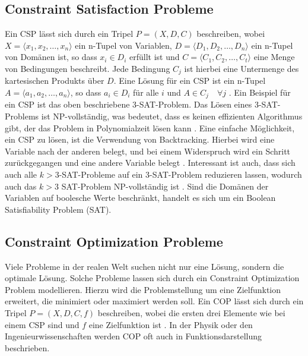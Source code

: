 \subsection{Constraint Satisfaction Probleme}
\label{sec:Constraint-Satisfaction-Probleme}

Ein CSP lässt sich durch ein Tripel \(P=(X,D,C)\) beschreiben, wobei \(X=\langle
x_{1},x_{2},\ldots,x_{n}\rangle\) ein n-Tupel von Variablen, \(D=\langle
D_{1},D_{2},\ldots,D_{n}\rangle\) ein n-Tupel von Domänen ist, so dass \(x_i\in
D_{i}\) erfüllt ist und \(C=\langle C_1,C_2,\ldots,C_t\rangle\) eine Menge von
Bedingungen beschreibt. Jede Bedingung \(C_j\) ist hierbei eine Untermenge des
kartesischen Produkts über \(D\). Eine Lösung für ein CSP ist ein n-Tupel
\(A=\langle a_1,a_2,\ldots,a_n\rangle \), so dass \(a_i\in D_i\) für alle \(i\)
und \(A \in C_j \quad \forall j\) \cite[16]{rossi06bo}. Ein Beispiel für ein CSP
ist das oben beschriebene 3-SAT-Problem. Das Lösen eines 3-SAT-Problems ist
NP-vollständig, was bedeutet, dass es keinen effizienten Algorithmus gibt, der
das Problem in Polynomialzeit lösen kann \cite[17]{rossi06bo}. Eine einfache
Möglichkeit, ein CSP zu lösen, ist die Verwendung von Backtracking. Hierbei wird
eine Variable nach der anderen belegt, und bei einem Widerspruch wird ein
Schritt zurückgegangen und eine andere Variable belegt \cite[21]{rossi06bo}.
Interessant ist auch, dass sich auch alle \(k>3\)-SAT-Probleme auf ein
3-SAT-Problem reduzieren lassen, wodurch auch das \(k>3\) SAT-Problem
NP-vollständig ist \cite[206]{gritz13bo}. Sind die Domänen der Variablen auf
boolesche Werte beschränkt, handelt es sich um ein Boolean Satisfiability
Problem (SAT).


\subsection{Constraint Optimization Probleme}
\label{sec:Constraint-Optimization-Probleme}

Viele Probleme in der realen Welt suchen nicht nur eine Lösung, sondern die
optimale Lösung. Solche Probleme lassen sich durch ein Constraint Optimization
Problem modellieren. Hierzu wird die Problemstellung um eine Zielfunktion
erweitert, die minimiert oder maximiert werden soll. Ein COP lässt sich durch
ein Tripel \(P=(X,D,C,f)\) beschreiben, wobei die ersten drei Elemente wie bei
einem CSP sind und \(f\) eine Zielfunktion ist \cite[22]{amadi15jo}. In der
Physik oder den Ingenieurwissenschaften werden COP oft auch in
Funktionsdarstellung beschrieben.

